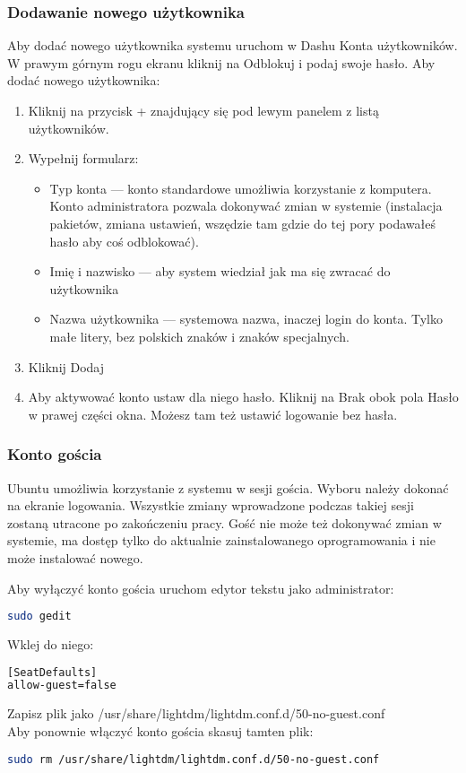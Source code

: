 \subsubsection{Dodawanie nowego użytkownika}
Aby dodać nowego użytkownika systemu uruchom w Dashu \textcolor{ubuntu_orange}{Konta użytkowników}. W prawym górnym rogu ekranu kliknij na \textcolor{ubuntu_orange}{Odblokuj} i podaj swoje hasło. Aby dodać nowego użytkownika:
\begin{enumerate}
\item Kliknij na przycisk \textcolor{ubuntu_orange}{+} znajdujący się pod lewym panelem z listą użytkowników.
\item Wypełnij formularz:
\begin{itemize}
\item \textcolor{ubuntu_orange}{Typ konta} --- konto standardowe umożliwia korzystanie z komputera. Konto administratora pozwala dokonywać zmian w systemie (instalacja pakietów, zmiana ustawień, wszędzie tam gdzie do tej pory podawałeś hasło aby coś odblokować).
\item \textcolor{ubuntu_orange}{Imię i nazwisko} --- aby system wiedział jak ma się zwracać do użytkownika
\item \textcolor{ubuntu_orange}{Nazwa użytkownika} --- systemowa nazwa, inaczej login do konta. Tylko małe litery, bez polskich znaków i znaków specjalnych.
\end{itemize}
\item Kliknij \textcolor{ubuntu_orange}{Dodaj}
\item Aby aktywować konto ustaw dla niego hasło. Kliknij na \textcolor{ubuntu_orange}{Brak} obok pola \textcolor{ubuntu_orange}{Hasło} w prawej części okna. Możesz tam też ustawić logowanie bez hasła.
\end{enumerate}

\subsubsection{Konto gościa}
Ubuntu umożliwia korzystanie z systemu w sesji gościa. Wyboru należy dokonać na ekranie logowania. Wszystkie zmiany wprowadzone podczas takiej sesji zostaną utracone po zakończeniu pracy. Gość nie może też dokonywać zmian w systemie, ma dostęp tylko do aktualnie zainstalowanego oprogramowania i nie może instalować nowego.

Aby wyłączyć konto gościa uruchom edytor tekstu jako administrator:
\begin{lstlisting}[language=bash]
sudo gedit
\end{lstlisting}

Wklej do niego:

\begin{lstlisting}[language=bash]
[SeatDefaults]
allow-guest=false
\end{lstlisting}

Zapisz plik jako /usr/share/lightdm/lightdm.conf.d/50-no-guest.conf\\
Aby ponownie włączyć konto gościa skasuj tamten plik:

\begin{lstlisting}[language=bash]
sudo rm /usr/share/lightdm/lightdm.conf.d/50-no-guest.conf
\end{lstlisting}